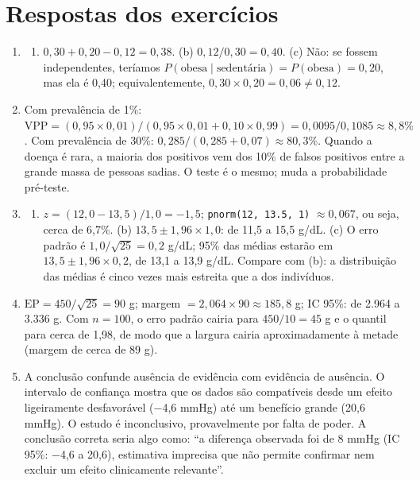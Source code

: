 \documentclass[
]{book}
\providecommand{\tightlist}{%
  \setlength{\itemsep}{0pt}\setlength{\parskip}{0pt}}
\begin{document}
\section{Respostas dos exercícios}\label{respostas-dos-exercuxedcios-4}

\begin{enumerate}
\def\labelenumi{\arabic{enumi}.}
\item
  \begin{enumerate}
  \def\labelenumii{(\alph{enumii})}
  \tightlist
  \item
    \(0{,}30 + 0{,}20 - 0{,}12 = 0{,}38\). (b) \(0{,}12/0{,}30 = 0{,}40\). (c) Não: se fossem independentes, teríamos \(P(\text{obesa} \mid \text{sedentária}) = P(\text{obesa}) = 0{,}20\), mas ela é 0,40; equivalentemente, \(0{,}30 \times 0{,}20 = 0{,}06 \neq 0{,}12\).
  \end{enumerate}
\item
  Com prevalência de 1\%: \(\text{VPP} = (0{,}95 \times 0{,}01)/(0{,}95 \times 0{,}01 + 0{,}10 \times 0{,}99) = 0{,}0095/0{,}1085 \approx 8{,}8\%\). Com prevalência de 30\%: \(0{,}285/(0{,}285 + 0{,}07) \approx 80{,}3\%\). Quando a doença é rara, a maioria dos positivos vem dos 10\% de falsos positivos entre a grande massa de pessoas sadias. O teste é o mesmo; muda a probabilidade pré-teste.
\item
  \begin{enumerate}
  \def\labelenumii{(\alph{enumii})}
  \tightlist
  \item
    \(z = (12{,}0 - 13{,}5)/1{,}0 = -1{,}5\); \texttt{pnorm(12,\ 13.5,\ 1)} \(\approx 0{,}067\), ou seja, cerca de 6,7\%. (b) \(13{,}5 \pm 1{,}96 \times 1{,}0\): de 11,5 a 15,5 g/dL. (c) O erro padrão é \(1{,}0/\sqrt{25} = 0{,}2\) g/dL; 95\% das médias estarão em \(13{,}5 \pm 1{,}96 \times 0{,}2\), de 13,1 a 13,9 g/dL. Compare com (b): a distribuição das médias é cinco vezes mais estreita que a dos indivíduos.
  \end{enumerate}
\item
  \(\text{EP} = 450/\sqrt{25} = 90\) g; margem \(= 2{,}064 \times 90 \approx 185{,}8\) g; IC 95\%: de 2.964 a 3.336 g. Com \(n = 100\), o erro padrão cairia para \(450/10 = 45\) g e o quantil para cerca de 1,98, de modo que a largura cairia aproximadamente à metade (margem de cerca de 89 g).
\item
  A conclusão confunde ausência de evidência com evidência de ausência. O intervalo de confiança mostra que os dados são compatíveis desde um efeito ligeiramente desfavorável (−4,6 mmHg) até um benefício grande (20,6 mmHg). O estudo é inconclusivo, provavelmente por falta de poder. A conclusão correta seria algo como: ``a diferença observada foi de 8 mmHg (IC 95\%: −4,6 a 20,6), estimativa imprecisa que não permite confirmar nem excluir um efeito clinicamente relevante''.

\end{enumerate}
\end{document}
